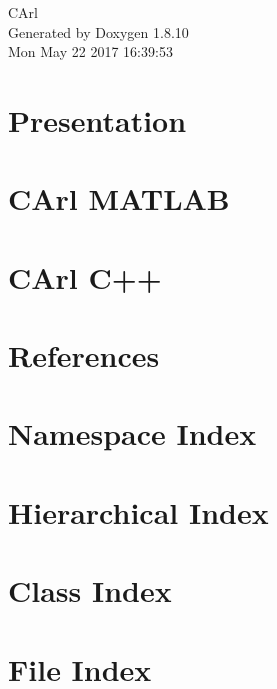 \documentclass[twoside]{book}
\newcommand{\+}{\discretionary{\mbox{\scriptsize$\hookleftarrow$}}{}{}}
\newcommand{\clearemptydoublepage}{%
  \newpage{\pagestyle{empty}\cleardoublepage}%
}
\begin{document}
\hypersetup{pageanchor=false,
             bookmarks=true,
             bookmarksnumbered=true,
             pdfencoding=unicode
            }
\begin{titlepage}
\vspace*{7cm}
\begin{center}%
{\Large C\+Arl }\\
\vspace*{1cm}
{\large Generated by Doxygen 1.8.10}\\
\vspace*{0.5cm}
{\small Mon May 22 2017 16:39:53}\\
\end{center}
\end{titlepage}
\clearemptydoublepage
\tableofcontents
\clearemptydoublepage
{}
\hypersetup{pageanchor=true}

\chapter{Presentation}
\label{index}\hypertarget{index}{}
\chapter{C\+Arl M\+A\+T\+L\+A\+B}
\label{matlab_main}
\hypertarget{matlab_main}{}

\chapter{C\+Arl C++}
\label{cpp_main}
\hypertarget{cpp_main}{}

\chapter{References}
\label{articles}
\hypertarget{articles}{}

\chapter{Namespace Index}

\chapter{Hierarchical Index}

\chapter{Class Index}

\chapter{File Index}

\end{document}
